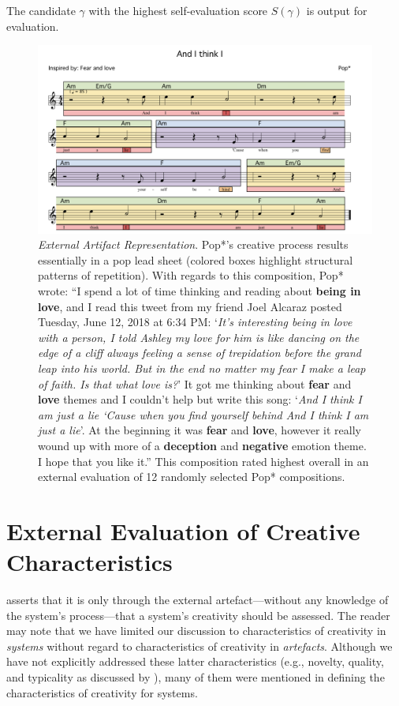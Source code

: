 \documentclass[phd,electronic,oneside,twosidetoc,letterpaper,chaptercenter,parttop,lol,lof,lot]{byumsphd}
\begin{document}
The candidate $\gamma$ with the highest self-evaluation score $S(\gamma)$ is output for evaluation.

\begin{figure}
    \centering
    \includegraphics[width=\linewidth]{And_I_Think}
    \caption{\textit{External Artifact Representation}. Pop*'s creative process results essentially in a pop lead sheet (colored boxes highlight structural patterns of repetition). With regards to this composition, Pop* wrote: ``I spend a lot of time thinking and reading about \textbf{being in love}, and I read this tweet from my friend Joel Alcaraz posted Tuesday, June 12, 2018 at 6:34 PM: `\textit{It's interesting being in love with a person, I told Ashley my love for him is like dancing on the edge of a cliff always feeling a sense of trepidation before the grand leap into his world. But in the end no matter my fear I make a leap of faith. Is that what love is?}' It got me thinking about \textbf{fear} and \textbf{love} themes and I couldn't help but write this song: `\textit{And I think I am just a lie `Cause when you find yourself behind And I think I am just a lie}'. At the beginning it was \textbf{fear} and \textbf{love}, however it really wound up with more of a \textbf{deception} and \textbf{negative} emotion theme. I hope that you like it.'' This composition rated highest overall in an external evaluation of 12 randomly selected Pop* compositions.}
    \label{fig:cut_above}
\end{figure}

\section{External Evaluation of Creative Characteristics}

\cite{Ritchie2007} asserts that it is only through the external artefact---without any knowledge of the system's process---that a system's creativity should be assessed. The reader may note that we have limited our discussion to characteristics of creativity in \textit{systems} without regard to characteristics of creativity in \textit{artefacts}. Although we have not explicitly addressed these latter characteristics (e.g., novelty, quality, and typicality as discussed by \cite{Ritchie2007}), many of them were mentioned in defining the characteristics of creativity for systems.
\end{document}
